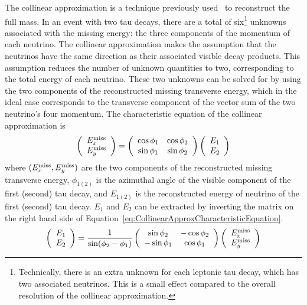 The collinear approximation is a technique previously
used~\cite{Rainwater:1998kj} to reconstruct the full \TT mass.  In an
event with two tau decays, there are a total of six\footnote{Technically, there
is an extra unknown for each leptonic tau decay, which has two associated
neutrinos.  This is a small effect compared to the overall resolution of the
collinear approximation.} unknowns associated with the
missing energy: the three components of the momentum of each neutrino.  The
collinear approximation makes the assumption that the neutrinos have the same
direction as their associated visible decay products.  This assumption reduces
the number of unknown quantities to two, corresponding to the total energy of
each neutrino.  These two unknowns can be solved for by using the two components
of the reconstructed missing transverse energy, which in the ideal case
corresponds to the transverse component of the vector sum of the two neutrino's
four momentum.  The characteristic equation of the collinear approximation is 
\begin{equation}
  \left( \begin{array}{c} E_{x}^{\text{miss}} \\ E_{y}^{\text{miss}} \end{array} \right) = 
    \left( \begin{array}{cc} 
      \cos\phi_1 & \cos\phi_2 \\
      \sin\phi_1 & \sin\phi_2 
    \end{array} \right) 
    \left(\begin{array}{c} E_1 \\ E_2 \end{array} \right)
      \label{eq:CollinearApproxCharacteristicEquation}
\end{equation}
where $(E_{x}^{\text{miss}}, E_{y}^{\text{miss}})$ are the two components of the reconstructed missing
transverse energy, $\phi_{1(2)}$ is the azimuthal angle of the visible component
of the first (second) tau decay, and $E_{1(2)}$ is the reconstructed energy of
neutrino of the first (second) tau decay.  $E_1$ and $E_2$ can be extracted by
inverting the matrix on the right hand side of
Equation~\ref{eq:CollinearApproxCharacteristicEquation}.
\begin{equation}
  \left(\begin{array}{c} E_1 \\ E_2 \end{array} \right) = 
    \frac{1}{\sin(\phi_2 - \phi_1)} 
    \left( \begin{array}{cc} 
      \sin\phi_2 & -\cos\phi_2 \\
      -\sin\phi_1 & \cos\phi_1 
    \end{array} \right) 
  \left( \begin{array}{c} E_{x}^{\text{miss}} \\ E_{y}^{\text{miss}} \end{array} \right) 
    \label{eq:CollinearApproxInvertedEquation} 
\end{equation}

